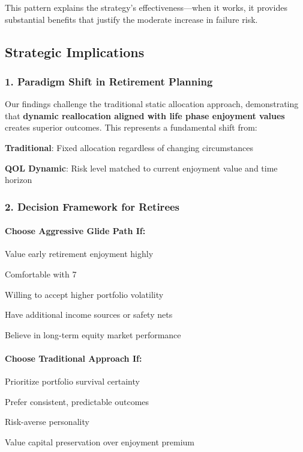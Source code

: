\documentclass[11pt,letterpaper]{article}
\begin{document}
{{{{{{{{{{{This pattern explains the strategy's effectiveness—when it works, it provides substantial benefits that justify the moderate increase in failure risk.




\subsection{Strategic Implications}


\subsubsection{1. Paradigm Shift in Retirement Planning}


Our findings challenge the traditional static allocation approach, demonstrating that \textbf{dynamic reallocation aligned with life phase enjoyment values} creates superior outcomes. This represents a fundamental shift from:


\item \textbf{Traditional}: Fixed allocation regardless of changing circumstances
\item \textbf{QOL Dynamic}: Risk level matched to current enjoyment value and time horizon

\subsubsection{2. Decision Framework for Retirees}


\paragraph{Choose Aggressive Glide Path If:}

\item Value early retirement enjoyment highly
\item Comfortable with 7%
\item Willing to accept higher portfolio volatility
\item Have additional income sources or safety nets
\item Believe in long-term equity market performance

\paragraph{Choose Traditional Approach If:}

\item Prioritize portfolio survival certainty
\item Prefer consistent, predictable outcomes
\item Risk-averse personality
\item Value capital preservation over enjoyment premium

}}}}}}}}}}}
\end{document}
